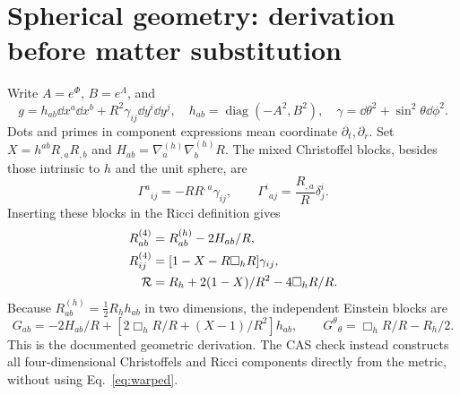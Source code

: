 \section{Spherical geometry: derivation before matter substitution}
Write $A=e^\Phi$, $B=e^\Lambda$, and
\begin{equation}
 g=h_{ab}\dd x^a\dd x^b+R^2\gamma_{ij}\dd y^i\dd y^j,
 \quad h_{ab}=\operatorname{diag}(-A^2,B^2),\quad \gamma=\dd\theta^2+\sin^2\theta\dd\phi^2.
\end{equation}
Dots and primes in component expressions mean coordinate $\partial_t,\partial_r$. Set $X=h^{ab}R_{,a}R_{,b}$ and $H_{ab}=\nabla^{(h)}_a\nabla^{(h)}_bR$. The mixed Christoffel blocks, besides those intrinsic to $h$ and the unit sphere, are
\begin{equation}
 \Gamma^a{}_{ij}=-R R^{,a}\gamma_{ij},\qquad
 \Gamma^i{}_{aj}=\frac{R_{,a}}R\delta^i_j.
\end{equation}
Inserting these blocks in the Ricci definition gives
\begin{align}
 R^{(4)}_{ab}&=R^{(h)}_{ab}-2H_{ab}/R,\\
 R^{(4)}_{ij}&=[1-X-R\Box_hR]\gamma_{ij},\\
 \mathcal R&=R_h+2(1-X)/R^2-4\Box_hR/R.
\end{align}
Because $R^{(h)}_{ab}=\tfrac12R_hh_{ab}$ in two dimensions, the independent Einstein blocks are
\begin{equation}\label{eq:warped}
 G_{ab}=-2H_{ab}/R+\left[2\Box_hR/R+(X-1)/R^2\right]h_{ab},\qquad
 G^\theta{}_\theta=\Box_hR/R-R_h/2.
\end{equation}
This is the documented geometric derivation. The CAS check instead constructs all four-dimensional Christoffels and Ricci components directly from the metric, without using Eq.~\eqref{eq:warped}.

